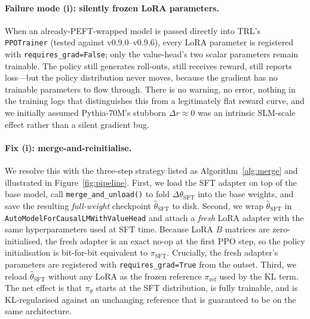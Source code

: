 \documentclass[10pt,twocolumn,letterpaper]{article}
\begin{document}
\paragraph{Failure mode (i): silently frozen LoRA parameters.}
When an already-PEFT-wrapped model is passed directly into TRL's \texttt{PPOTrainer} (tested against v0.9.0--v0.9.6), every LoRA parameter is registered with \texttt{requires\_grad=False}; only the value-head's two scalar parameters remain trainable. The policy still generates roll-outs, still receives reward, still reports loss---but the policy distribution never moves, because the gradient has no trainable parameters to flow through. There is no warning, no error, nothing in the training logs that distinguishes this from a legitimately flat reward curve, and we initially assumed Pythia-70M's stubborn $\Delta r\approx 0$ was an intrinsic SLM-scale effect rather than a silent gradient bug.

\paragraph{Fix (i): merge-and-reinitialise.}
We resolve this with the three-step strategy listed as Algorithm~\ref{alg:merge} and illustrated in Figure~\ref{fig:pipeline}. First, we load the SFT adapter on top of the base model, call \texttt{merge\_and\_unload()} to fold $\Delta\theta_{\text{SFT}}$ into the base weights, and save the resulting \emph{full-weight} checkpoint $\hat{\theta}_{\text{SFT}}$ to disk. Second, we wrap $\hat{\theta}_{\text{SFT}}$ in \texttt{AutoModelForCausalLMWithValueHead} and attach a \emph{fresh} LoRA adapter with the same hyperparameters used at SFT time. Because LoRA $B$ matrices are zero-initialised, the fresh adapter is an exact no-op at the first PPO step, so the policy initialisation is bit-for-bit equivalent to $\pi_{\text{SFT}}$. Crucially, the fresh adapter's parameters are registered with \texttt{requires\_grad=True} from the outset. Third, we reload $\hat{\theta}_{\text{SFT}}$ without any LoRA as the frozen reference $\pi_{\text{ref}}$ used by the KL term. The net effect is that $\pi_\theta$ starts at the SFT distribution, is fully trainable, and is KL-regularised against an unchanging reference that is guaranteed to be on the same architecture.
\end{document}

